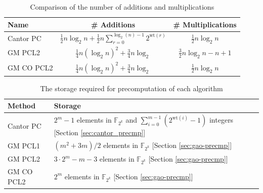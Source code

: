 \begin{table}[h]
	\centering
	\caption{Comparison of the number of additions and multiplications}
	\renewcommand{\arraystretch}{1.5}  %
	{
		\begin{tabular}{lcc}
			\toprule
			\textbf{Name} &  \textbf{\# Additions} & \textbf{\# Multiplications} \\
			\midrule
			Cantor PC & $\frac{1}{2} n\log_2 n + \frac{1}{2}n\sum_{r=0}^{\log_2 (n)-1} 2^{\text{wt}(r)}$  & $\frac{1}{2} n\log_2 n$ \\
			GM PCL2  & $\frac{1}{4}n(\log_2n)^2 + \frac{3}{4}n\log_2$  & $\frac{3}{2} n \log_2 n -n +1$ \\
			GM CO PCL2 & $\frac{1}{4}n(\log_2n)^2 + \frac{3}{4}n\log_2$ & $\frac{1}{2} n\log_2 n$\\
			 \bottomrule
		\end{tabular}
	}
	\label{tab:FFTcomparisons}
\end{table}


\begin{table}
	\centering
	\caption{The storage required for precomputation of each algorithm}
	\setlength{\tabcolsep}{8pt} %
		\begin{tabular}{ll}
			\toprule
			\textbf{Method} & \textbf{Storage} \\
			\midrule
			Cantor PC & $2^m - 1$ elements in $\mathbb{F}_{2^k}$ and $\sum_{i=0}^{m-1} \left(2^{\text{wt}(i)} - 1\right)$ integers [Section \ref{sec:cantor_precmp}]\\ 
			GM PCL1 & $(m^2 + 3m) / 2$ elements in $\mathbb{F}_{2^k}$ [Section \ref{sec:gao-precmp}]\\
			GM PCL2 & $3 \cdot 2^m - m - 3$ elements in $\mathbb{F}_{2^k}$ [Section \ref{sec:gao-precmp}]\\
			GM CO PCL2 & $2^m$ elements in $\mathbb{F}_{2^k}$ [Section \ref{sec:gao-precmp}]\\
			\bottomrule
	\end{tabular}
	\label{tab:precmp_comparison}
\end{table}


